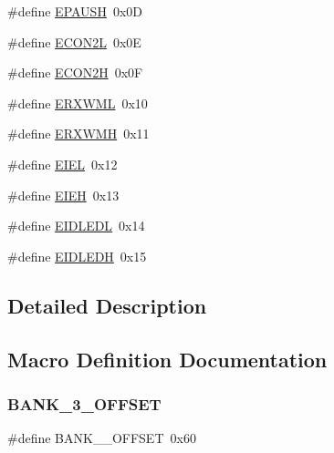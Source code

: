 \begin{DoxyCompactItemize}
\item 
\#define \mbox{\hyperlink{group___b_a_n_k__3_ga3fc2cb9d4e34c421421abe509fc25424}{E\+P\+A\+U\+SH}}~0x0D
\item 
\#define \mbox{\hyperlink{group___b_a_n_k__3_ga5fa3b848fbaf61a57c63846036a3bb18}{E\+C\+O\+N2L}}~0x0E
\item 
\#define \mbox{\hyperlink{group___b_a_n_k__3_ga0fcc3e9df9da3725e72d4896863de0c5}{E\+C\+O\+N2H}}~0x0F
\item 
\#define \mbox{\hyperlink{group___b_a_n_k__3_ga8c18608776987b700c0968b6e8ae8c55}{E\+R\+X\+W\+ML}}~0x10
\item 
\#define \mbox{\hyperlink{group___b_a_n_k__3_ga51a385ad7c05dac2cbeb4e9a48bbaa25}{E\+R\+X\+W\+MH}}~0x11
\item 
\#define \mbox{\hyperlink{group___b_a_n_k__3_ga741ee43d03a336c43f256818f013d5e7}{E\+I\+EL}}~0x12
\item 
\#define \mbox{\hyperlink{group___b_a_n_k__3_ga4511cde5566ea86b10adb8572f136836}{E\+I\+EH}}~0x13
\item 
\#define \mbox{\hyperlink{group___b_a_n_k__3_gadb2da2b4a891ac4a12f067fd6ce8b848}{E\+I\+D\+L\+E\+DL}}~0x14
\item 
\#define \mbox{\hyperlink{group___b_a_n_k__3_ga80e3092cf8c31479d54986e1bddf888b}{E\+I\+D\+L\+E\+DH}}~0x15
\end{DoxyCompactItemize}


\subsection{Detailed Description}


\subsection{Macro Definition Documentation}
\mbox{\label{group___b_a_n_k__3_gafe3718fe6c607fc8c48e91ad5f2787b2}} 
\subsubsection{\texorpdfstring{BANK\_3\_OFFSET}{BANK\_3\_OFFSET}}
{\footnotesize\ttfamily \#define B\+A\+N\+K\+\_\+\_\+\+O\+F\+F\+S\+ET~0x60}

\mbox{\label{group___b_a_n_k__3_ga0fcc3e9df9da3725e72d4896863de0c5}} 
